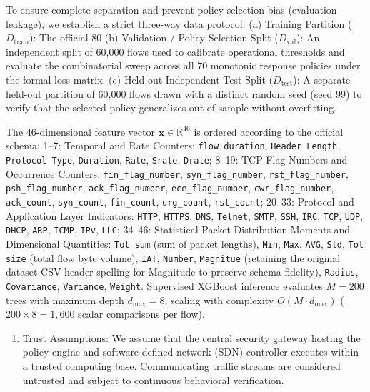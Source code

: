 \documentclass[journal,10pt,onecolumn]{IEEEtran}
\begin{document}
To ensure complete separation and prevent policy-selection bias (evaluation leakage), we establish a strict three-way data protocol:
(a) Training Partition ($D_{\text{train}}$): The official 80%
(b) Validation / Policy Selection Split ($D_{\text{val}}$): An independent split of 60,000 flows used to calibrate operational thresholds and evaluate the combinatorial sweep across all 70 monotonic response policies under the formal loss matrix.
(c) Held-out Independent Test Split ($D_{\text{test}}$): A separate held-out partition of 60,000 flows drawn with a distinct random seed (seed 99) to verify that the selected policy generalizes out-of-sample without overfitting.

The 46-dimensional feature vector $\mathbf{x} \in \mathbb{R}^{46}$ is ordered according to the official schema:
1–7: Temporal and Rate Counters: \texttt{flow_duration}, \texttt{Header_Length}, \texttt{Protocol Type}, \texttt{Duration}, \texttt{Rate}, \texttt{Srate}, \texttt{Drate};
8–19: TCP Flag Numbers and Occurrence Counters: \texttt{fin_flag_number}, \texttt{syn_flag_number}, \texttt{rst_flag_number}, \texttt{psh_flag_number}, \texttt{ack_flag_number}, \texttt{ece_flag_number}, \texttt{cwr_flag_number}, \texttt{ack_count}, \texttt{syn_count}, \texttt{fin_count}, \texttt{urg_count}, \texttt{rst_count};
20–33: Protocol and Application Layer Indicators: \texttt{HTTP}, \texttt{HTTPS}, \texttt{DNS}, \texttt{Telnet}, \texttt{SMTP}, \texttt{SSH}, \texttt{IRC}, \texttt{TCP}, \texttt{UDP}, \texttt{DHCP}, \texttt{ARP}, \texttt{ICMP}, \texttt{IPv}, \texttt{LLC};
34–46: Statistical Packet Distribution Moments and Dimensional Quantities: \texttt{Tot sum} (sum of packet lengths), \texttt{Min}, \texttt{Max}, \texttt{AVG}, \texttt{Std}, \texttt{Tot size} (total flow byte volume), \texttt{IAT}, \texttt{Number}, \texttt{Magnitue} (retaining the original dataset CSV header spelling for Magnitude to preserve schema fidelity), \texttt{Radius}, \texttt{Covariance}, \texttt{Variance}, \texttt{Weight}.
Supervised XGBoost inference evaluates $M = 200$ trees with maximum depth $d_{\max} = 8$, scaling with complexity $O(M \cdot d_{\max})$ ($200 \times 8 = 1,600$ scalar comparisons per flow).

\begin{enumerate}
  \item Trust Assumptions: We assume that the central security gateway hosting the policy engine and software-defined network (SDN) controller executes within a trusted computing base. Communicating traffic streams are considered untrusted and subject to continuous behavioral verification.
\end{enumerate}
\end{document}
